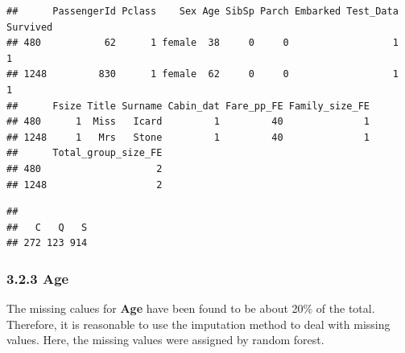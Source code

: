 \documentclass[
]{article}
\newenvironment{Shaded}{\begin{snugshade}}{\end{snugshade}}
\newcommand{\DecValTok}[1]{\textcolor[rgb]{0.00,0.00,0.81}{#1}}
\newcommand{\FunctionTok}[1]{\textcolor[rgb]{0.00,0.00,0.00}{#1}}
\newcommand{\NormalTok}[1]{#1}
\newcommand{\OtherTok}[1]{\textcolor[rgb]{0.56,0.35,0.01}{#1}}
\newcommand{\SpecialCharTok}[1]{\textcolor[rgb]{0.00,0.00,0.00}{#1}}
\newcommand{\StringTok}[1]{\textcolor[rgb]{0.31,0.60,0.02}{#1}}
\begin{document}
\begin{verbatim}
##      PassengerId Pclass    Sex Age SibSp Parch Embarked Test_Data Survived
## 480           62      1 female  38     0     0                  1        1
## 1248         830      1 female  62     0     0                  1        1
##      Fsize Title Surname Cabin_dat Fare_pp_FE Family_size_FE
## 480      1  Miss   Icard         1         40              1
## 1248     1   Mrs   Stone         1         40              1
##      Total_group_size_FE
## 480                    2
## 1248                   2
\end{verbatim}

\begin{Shaded}
\end{Shaded}

\begin{verbatim}
## 
##   C   Q   S 
## 272 123 914
\end{verbatim}

\hypertarget{age-1}{%
\subsubsection{\texorpdfstring{\textbf{3.2.3
Age}}{3.2.3 Age}}\label{age-1}}

The missing calues for \textbf{Age} have been found to be about 20\% of
the total. Therefore, it is reasonable to use the imputation method to
deal with missing values. Here, the missing values were assigned by
random forest.
\end{document}
